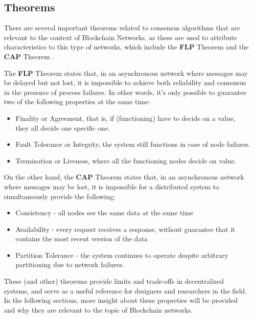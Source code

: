 \subsection*{Theorems}
There are several important theorems related to consensus algorithms that are relevant to the context of Blockchain Networks, as these are used to attribute characteristics to this type of networks, which include the \textbf{FLP} Theorem \cite{fischer1985impossibility} and the \textbf{CAP} Theorem \cite{brewer2000towards}.


The \textbf{FLP} Theorem states that, in an asynchronous network where messages may be delayed but not lost, it is impossible to achieve both reliability and consensus in the presence of process failures. In other words, it's only possible to guarantee two of the following properties at the same time:
\begin{itemize}
    \item Finality or Agreement, that is, if (functioning) have to decide on a value, they all decide one specific one.
    \item Fault Tolerance or Integrity, the system still functions in case of node failures.
    \item Termination or Liveness, where all the functioning nodes decide on value.
\end{itemize}



On the other hand, the \textbf{CAP} Theorem states that, in an asynchronous network where messages may be lost, it is impossible for a distributed system to simultaneously provide the following:
\begin{itemize}
    \item Consistency - all nodes see the same data at the same time
    \item Availability - every request receives a response, without guarantee that it contains the most recent version of the data
    \item Partition Tolerance - the system continues to operate despite arbitrary partitioning due to network failures.
\end{itemize}


These (and other) theorems provide limits and trade-offs in decentralized systems, and serve as a useful reference for designers and researchers in the field.
In the following sections, more insight about these propreties will be provided and why they are relevant to the topic of Blockchain networks.

